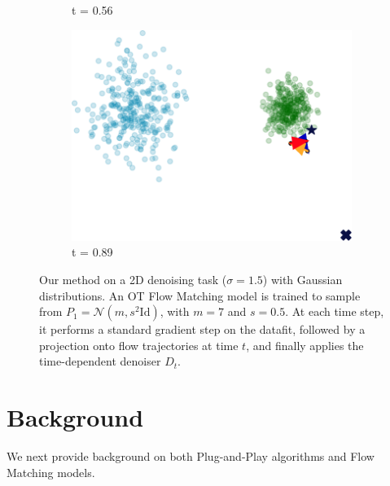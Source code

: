 \documentclass{article} %
\newcommand{\Id}{\mathrm{Id}}
\theoremstyle{definition}
\begin{document}
\begin{figure}[t!]
\begin{subfigure}{0.3\textwidth}
     \caption{t = 0.56}
        \label{fig:figure2}
    \end{subfigure}%
    \hfill 
    \begin{subfigure}{0.3\textwidth}
        \centering
    \includegraphics[width=\textwidth]{figures/toy/final_0.89_toy.pdf} 
    \caption{t = 0.89}
        \label{fig:figure3}
    \end{subfigure}

    \caption{Our method on a 2D denoising task ($\sigma=1.5$) with Gaussian distributions. 
    An OT Flow Matching model is trained to sample from $P_1 = \mathcal N(m, s^2 \Id)$, with $m=7$ and $s=0.5$.
    At each time step, it performs a standard gradient step on the datafit, followed by a projection onto flow trajectories at time $t$, and finally applies the time-dependent denoiser $D_t$.}
    \label{fig:2DEX_gaussian_to_gaussian}
\end{figure}


%
\section{Background}
We next provide background on both Plug-and-Play algorithms and Flow Matching models.
\end{document}
